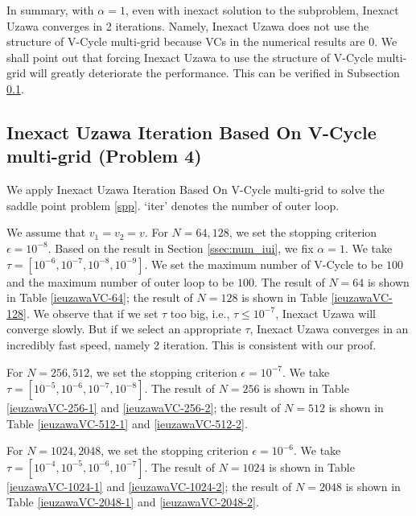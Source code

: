 \documentclass[english]{pkupaper}
\begin{document}
In summary, with $\alpha=1$, even with inexact solution to the subproblem, Inexact Uzawa converges in 2 iterations. Namely, Inexact Uzawa does not use the structure of V-Cycle multi-grid because VCs in the numerical results are $0$. We shall point out that forcing Inexact Uzawa to use the structure of V-Cycle multi-grid will greatly deteriorate the performance. This can be verified in Subsection \ref{ssec:iuibo}.

\subsection{Inexact Uzawa Iteration Based On V-Cycle multi-grid (Problem 4)}
\label{ssec:iuibo}
We apply Inexact Uzawa Iteration Based On V-Cycle multi-grid to solve the saddle point problem \ref{spp}. `iter' denotes the number of outer loop.

We assume that $v_1=v_2=v$. For $N=64, 128$, we set the stopping criterion $\epsilon = 10^{-8}$. Based on the result in Section \ref{ssec:num_iui}, we fix $\alpha = 1$. We take $\tau=[10^{-6}, 10^{-7}, 10^{-8}, 10^{-9}]$. We set the maximum number of V-Cycle to be $100$ and the maximum number of outer loop to be $100$. The result of $N=64$ is shown in Table \ref{ieuzawaVC-64}; the result of $N=128$ is shown in Table \ref{ieuzawaVC-128}. We observe that if we set $\tau$ too big, i.e., $\tau\leq 10^{-7}$, Inexact Uzawa will converge slowly. But if we select an appropriate $\tau$, Inexact Uzawa converges in an incredibly fast speed, namely 2 iteration. This is consistent with our proof.




For $N=256, 512$, we set the stopping criterion $\epsilon = 10^{-7}$. We take $\tau=[10^{-5}, 10^{-6}, 10^{-7}, 10^{-8}]$. The result of $N=256$ is shown in Table \ref{ieuzawaVC-256-1} and \ref{ieuzawaVC-256-2}; the result of $N=512$ is shown in Table \ref{ieuzawaVC-512-1} and \ref{ieuzawaVC-512-2}.





For $N=1024, 2048$, we set the stopping criterion $\epsilon = 10^{-6}$. We take $\tau=[10^{-4}, 10^{-5}, 10^{-6}, 10^{-7}]$. The result of $N=1024$ is shown in Table \ref{ieuzawaVC-1024-1} and \ref{ieuzawaVC-1024-2}; the result of $N=2048$ is shown in Table \ref{ieuzawaVC-2048-1} and \ref{ieuzawaVC-2048-2}.





\end{document}
